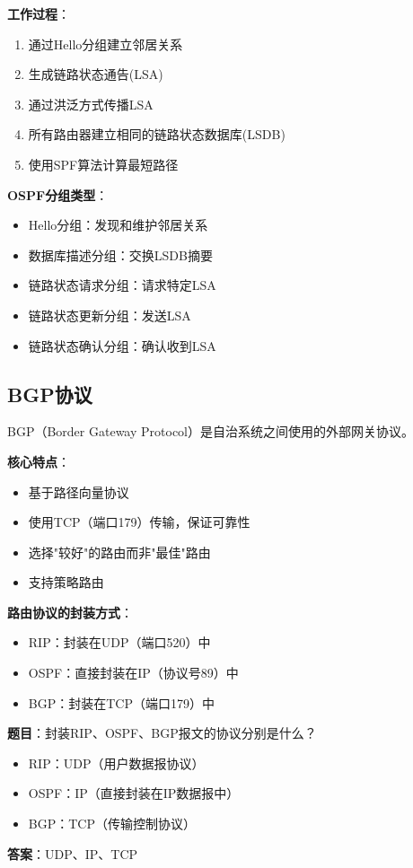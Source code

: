 \documentclass[12pt,a4paper,openany]{ctexbook}
\begin{document}
\textbf{工作过程}：
\begin{enumerate}[leftmargin=2em,itemsep=0pt]
    \item 通过Hello分组建立邻居关系
    \item 生成链路状态通告(LSA)
    \item 通过洪泛方式传播LSA
    \item 所有路由器建立相同的链路状态数据库(LSDB)
    \item 使用SPF算法计算最短路径
\end{enumerate}

\textbf{OSPF分组类型}：
\begin{itemize}[leftmargin=2em,itemsep=0pt]
    \item Hello分组：发现和维护邻居关系
    \item 数据库描述分组：交换LSDB摘要
    \item 链路状态请求分组：请求特定LSA
    \item 链路状态更新分组：发送LSA
    \item 链路状态确认分组：确认收到LSA
\end{itemize}

\subsection{BGP协议}
BGP（Border Gateway Protocol）是自治系统之间使用的外部网关协议。

\textbf{核心特点}：
\begin{itemize}[leftmargin=2em,itemsep=0pt]
    \item 基于路径向量协议
    \item 使用TCP（端口179）传输，保证可靠性
    \item 选择"较好"的路由而非"最佳"路由
    \item 支持策略路由
\end{itemize}

\begin{notebox}
\textbf{路由协议的封装方式}：
\begin{itemize}[itemsep=0pt]
    \item RIP：封装在UDP（端口520）中
    \item OSPF：直接封装在IP（协议号89）中
    \item BGP：封装在TCP（端口179）中
\end{itemize}
\end{notebox}

\begin{examplebox}[例题4.7 路由协议]
\textbf{题目}：封装RIP、OSPF、BGP报文的协议分别是什么？
\tcblower
\begin{itemize}[itemsep=0pt]
    \item RIP：UDP（用户数据报协议）
    \item OSPF：IP（直接封装在IP数据报中）
    \item BGP：TCP（传输控制协议）
\end{itemize}

\textbf{答案}：UDP、IP、TCP
\end{examplebox}
\end{document}
